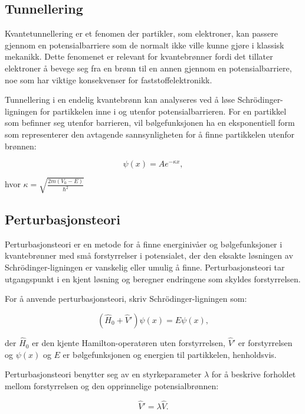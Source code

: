 \subsection*{Tunnellering}
Kvantetunnellering er et fenomen der partikler, som elektroner, kan passere gjennom en potensialbarriere som de normalt ikke ville kunne gjøre i klassisk mekanikk. Dette fenomenet er relevant for kvantebrønner fordi det tillater elektroner å bevege seg fra en brønn til en annen gjennom en potensialbarriere, noe som har viktige konsekvenser for faststoffelektronikk.

Tunnellering i en endelig kvantebrønn kan analyseres ved å løse Schrödinger-ligningen for partikkelen inne i og utenfor potensialbarrieren. For en partikkel som befinner seg utenfor barrieren, vil bølgefunksjonen ha en eksponentiell form som representerer den avtagende sannsynligheten for å finne partikkelen utenfor brønnen:

\begin{equation*}
\psi(x) = Ae^{-\kappa x},
\end{equation*}

hvor $\kappa = \sqrt{\frac{2m(V_0 - E)}{\hbar^2}}$

\subsection*{Perturbasjonsteori}
Perturbasjonsteori er en metode for å finne energinivåer og bølgefunksjoner i kvantebrønner med små forstyrrelser i potensialet, der den eksakte løsningen av Schrödinger-ligningen er vanskelig eller umulig å finne. Perturbasjonsteori tar utgangspunkt i en kjent løsning og beregner endringene som skyldes forstyrrelsen.

For å anvende perturbasjonsteori, skriv Schrödinger-ligningen som:

\begin{equation*}
(\hat{H}_0 + \hat{V}')\psi(x) = E\psi(x),
\end{equation*}

der $\hat{H}_0$ er den kjente Hamilton-operatøren uten forstyrrelsen, $\hat{V}'$ er forstyrrelsen og $\psi(x)$ og $E$ er bølgefunksjonen og energien til partikkelen, henholdsvis.

Perturbasjonsteori benytter seg av en styrkeparameter $\lambda$ for å beskrive forholdet mellom forstyrrelsen og den opprinnelige potensialbrønnen:

\begin{equation*}
\hat{V}' = \lambda\hat{V}.
\end{equation*}

